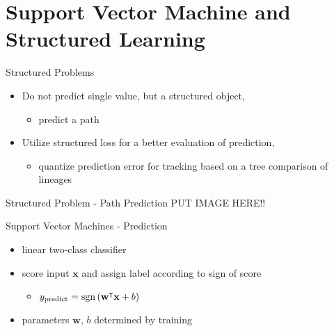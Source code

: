 \section{Support Vector Machine and Structured Learning}

\begin{frame}{Structured Problems}
    \begin{itemize}
          \item Do not predict single value, but a structured object,
        \begin{itemize}
              \item[] \eg predict a path
        \end{itemize}
          \item Utilize structured loss for a better evaluation of prediction, 
        \begin{itemize}
              \item[] \eg quantize prediction error for tracking based on a tree comparison of lineages
        \end{itemize}
    \end{itemize}
\end{frame}


\begin{frame}{Structured Problem - Path Prediction}
    PUT IMAGE HERE!!
\end{frame}


\begin{frame}{Support Vector Machines - Prediction}
    \begin{itemize}
          \item linear two-class classifier
          \item score input $\textbf{x}$ and assign label according to sign of score
        \begin{itemize}
              \item[] $y_{\text{predict}} = \operatorname{sgn}\left(\textbf{w}^{\intercal}\textbf{x} + b\right)$
        \end{itemize}
          \item parameters $\textbf{w}$, $b$ determined by training
    \end{itemize}
\end{frame}


